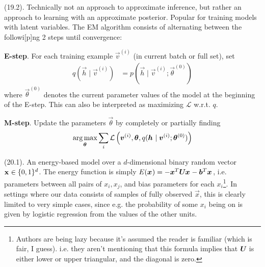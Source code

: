 \documentclass[11pt]{article}
\begin{document}
\myspace
\p {} (19.2). Technically not an approach to approximate inference, but rather an approach to learning with an approximate posterior. Popular for training models with latent variables. The EM algorithm consists of alternating between the followi[p]ng 2 steps until convergence:
\begin{compactenum}
	\item \textbf{E-step}. For each training example $\vec{v}^{(i)}$ (in current batch or full set), set
	\begin{align}
		q(\vec{h} \mid \vec{v}^{(i)}  )
			&= p(\vec{h} \mid \vec{v}^{(i)}; \vec{\theta}^{(0)})
	\end{align}
	where $\vec{\theta}^{(0)}$ denotes the current parameter values of the model at the beginning of the E-step. This can also be interpreted as maximizing $\mathcal L$ w.r.t. $q$. 
	
	\item \textbf{M-step}. Update the parameters $\vec{\theta}$ by completely or partially finding
	\begin{align}
		\operatorname*{arg\,max}_{\bm{\theta}_{}} \sum_i \mathcal{L}\left(\bm{v}_{}^{(i)}, \bm{\theta}_{}, q(\bm{h}_{} \mid \bm{v}_{}^{(i)}; \bm{\theta}_{}^{(0)} ) \right)
	\end{align} 
\end{compactenum}













%
% 


\p {} (20.1). An energy-based model over a $d$-dimensional binary random vector $\mathbf{x}_{} \in \{0, 1\}^d$. The energy function is simply $E(\bm{x}_{}) = -\bm{x}_{}^T \bm{U}_{} \bm{x}_{} - \bm{b}_{}^T \bm{x}_{}$, i.e. parameters between all pairs of $x_i, x_j$, and bias parameters for each $x_i$\footnote{Authors are being lazy because it's assumed the reader is familiar (which is fair, I guess). i.e. they aren't mentioning that this formula implies that $\bm{U}_{}$ is either lower or upper triangular, and the diagonal is zero.}. In settings where our data consists of samples of fully observed $\vec x$, this is clearly limited to very simple cases, since e.g. the probability of some $x_i$ being on is given by logistic regression from the values of the other units. 
\end{document}
